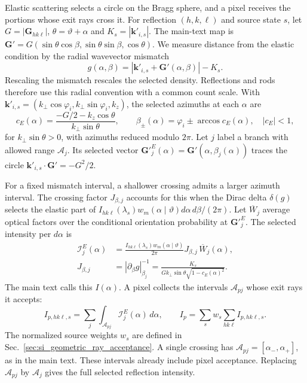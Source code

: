 Elastic scattering selects a circle on the Bragg sphere, and a pixel receives the portions whose exit rays cross it.\cite{AlsNielsenMcMorrow2001} For reflection $(h,k,\ell)$ and source state $s$, let $G=|\mathbf G_{hk\ell}|$, $\theta=\vartheta+\alpha$ and $K_s=|\mathbf k'_{i,s}|$. The main-text map is $\mathbf G'=G(\sin\theta\cos\beta,\sin\theta\sin\beta,\cos\theta)$. We measure distance from the elastic condition by the radial wavevector mismatch
\begin{equation}
  g(\alpha,\beta)=|\mathbf k'_{i,s}+\mathbf G'(\alpha,\beta)|-K_s.
  \label{eq:si_bragg_curve_mismatch}
\end{equation}
Rescaling the mismatch rescales the selected density. Reflections and rods therefore use this radial convention with a common count scale. With $\mathbf k'_{i,s}=(k_\perp\cos\varphi_i,k_\perp\sin\varphi_i,k_z)$, the selected azimuths at each $\alpha$ are
\begin{equation}
  c_E(\alpha)=\frac{-G/2-k_z\cos\theta}{k_\perp\sin\theta},
  \qquad
  \beta_\pm(\alpha)=\varphi_i\pm\arccos c_E(\alpha),
  \quad |c_E|<1,
  \label{eq:si_bragg_curve_azimuths}
\end{equation}
for $k_\perp\sin\theta>0$, with azimuths reduced modulo $2\pi$. Let $j$ label a branch with allowed range $\mathcal A_j$. Its selected vector $\mathbf G'^E_j(\alpha)=\mathbf G'(\alpha,\beta_j(\alpha))$ traces the circle $\mathbf k'_{i,s}\cdot\mathbf G'=-G^2/2$.

For a fixed mismatch interval, a shallower crossing admits a larger azimuth interval. The crossing factor $J_{\beta,j}$ accounts for this when the Dirac delta $\delta(g)$ selects the elastic part of $I_{hk\ell}(\lambda_s)w_m(\alpha\mid\vartheta)d\alpha\,d\beta/(2\pi)$. Let $\overline W_j$ average optical factors over the conditional orientation probability at $\mathbf G'^E_j$. The selected intensity per $d\alpha$ is
\begin{equation}
 \begin{aligned}
  \mathcal I^E_j(\alpha)
   &=\frac{I_{hk\ell}(\lambda_s)w_m(\alpha\mid\vartheta)}{2\pi}
     J_{\beta,j}\,\overline W_j(\alpha),\\
  J_{\beta,j}
   &=\left|\partial_\beta g\right|_{\beta_j}^{-1}
    =\frac{K_s}{Gk_\perp\sin\theta\sqrt{1-c_E(\alpha)^2}}.
 \end{aligned}
 \label{eq:si_bragg_curve_density}
\end{equation}
The main text calls this $I(\alpha)$. A pixel collects the intervals $\mathcal A_{pj}$ whose exit rays it accepts:
\begin{equation}
 I_{p,hk\ell,s}=\sum_j\int_{\mathcal A_{pj}}\mathcal I^E_j(\alpha)\,d\alpha,
 \qquad I_p=\sum_s w_s\sum_{hk\ell}I_{p,hk\ell,s}.
 \label{eq:si_bragg_pixel_integral}
\end{equation}
The normalized source weights $w_s$ are defined in Sec.~\ref{sec:si_geometric_ray_acceptance}. A single crossing has $\mathcal A_{pj}=[\alpha_-,\alpha_+]$, as in the main text. These intervals already include pixel acceptance. Replacing $\mathcal A_{pj}$ by $\mathcal A_j$ gives the full selected reflection intensity.


